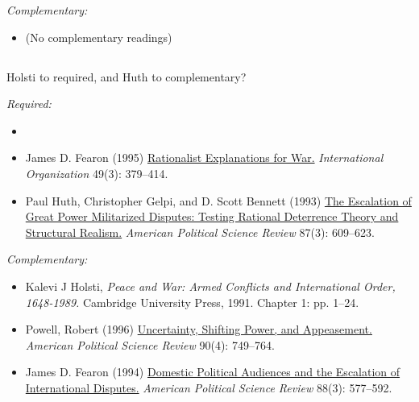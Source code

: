 \documentclass[12pt, a4paper]{article}
\begin{document}

\noindent\textit{Complementary:}

\begin{itemize}
  \item (No complementary readings)
\end{itemize}

\vspace{20pt}
\hline
\subsection*{{\color{red}{Session 2: Interstate war}}}

Holsti to required, and Huth to complementary?

\noindent\textit{Required:}

\begin{itemize}
  \item {}
  \item James D. Fearon (1995) \href{https://doi.org/10.1017/S0020818300033324}{Rationalist Explanations for War.} \textit{International Organization} 49(3): 379--414.
  \item Paul Huth, Christopher Gelpi, and D. Scott Bennett (1993) \href{https://doi.org/10.2307/2938739}{The Escalation of Great Power Militarized Disputes: Testing Rational Deterrence Theory and Structural Realism.} \textit{American Political Science Review} 87(3): 609--623.
\end{itemize}

\noindent\textit{Complementary:}

\begin{itemize}
  \item Kalevi J Holsti, \textit{Peace and War: Armed Conflicts and International Order, 1648-1989.} Cambridge University Press, 1991. Chapter 1: pp. 1--24.
  \item Powell, Robert (1996) \href{https://doi.org/10.2307/2945840}{Uncertainty, Shifting Power, and Appeasement.} \textit{American Political Science Review} 90(4): 749--764.
  \item James D. Fearon (1994) \href{https://doi.org/10.2307/2944796}{Domestic Political Audiences and the Escalation of International Disputes.} \textit{American Political Science Review} 88(3): 577--592.
\end{itemize}
\end{document}

